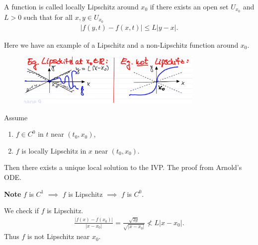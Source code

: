 \begin{definition}
A function is called locally Lipschitz around $x_0$ if there exists an open set $U_{x_0}$ and $L>0$ such that for all $x,y \in U_{x_0}$
\begin{align}
	\boxed{\left| f(y,t) - f(x,t)\right| \leq L |y - x|.}
\end{align}
\end{definition}

\begin{ex}
	Here we have an example of a Lipschitz and a non-Lipschitz function around $x_0$.
	\begin{figure}[h]
		\centering
		\includegraphics[width=0.8\textwidth]{figures/ch1/2lipschitz.png}
	\end{figure}
\end{ex}

\begin{theorem}[Picard]
	Assume 
	\begin{enumerate}
		\item  $f \in C^0$ in $t$ near $(t_0, x_0)$,
		\item $f$ is locally Lipschitz in $x$ near $(t_0, x_0)$.
	\end{enumerate}
	Then there exists a unique local solution to the IVP. The proof from Arnold's ODE. 	
\end{theorem}
\textbf{Note} $f$ is $C^1$ $\implies$ $f $ is Lipschitz $\implies $ $f$ is $C^0$.
\begin{ex}
	We check if $f$ is Lipschitz.
	\begin{align}
		\frac{| f(x) - f(x_0) |}{|x-x_0|} = \frac{\sqrt{2g}}{\sqrt{|x-x_0|}} \not< L | x - x_0|.
	\end{align}
Thus $f$ is not Lipschitz near $x_0$.	
\end{ex}


